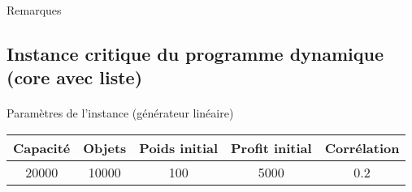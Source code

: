\documentclass[12pt]{article}
\begin{document}
\begin{figure}[!h]
\begin{floatrow}
\end{floatrow}
\end{figure}

\paragraph{}Remarques

\subsection{Instance critique du programme dynamique (core avec liste)}

\paragraph{}Paramètres de l'instance (générateur linéaire)

\begin{tabular}{|c|c|c|c|c|}
\hline
Capacité & Objets & Poids initial & Profit initial & Corrélation \\
\hline
20000 & 10000 & 100 & 5000 & 0.2 \\
\hline
\end{tabular}

\begin{figure}[!h]
\begin{floatrow}
\end{floatrow}
\end{figure}
\end{document}
